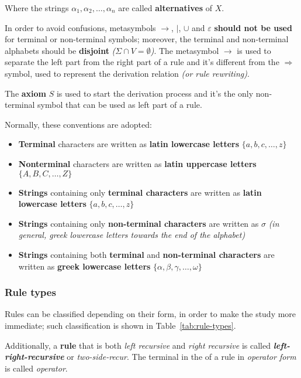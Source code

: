 \documentclass[english]{article}
\begin{document}
Where the strings \(\alpha_1, \alpha_2, \ldots, \alpha_n\) are called \textbf{alternatives} of \(X\).

In order to avoid confusions, metasymbols \(\rightarrow\), \(|\), \(\cup\) and \(\varepsilon\) \textbf{should not be used} for terminal or non-terminal symbols;
moreover, the terminal and non-terminal alphabets should be \textbf{disjoint} \textit{(\(\Sigma \cap V = \emptyset\))}.
The metasymbol \(\rightarrow\) is used to separate the left part from the right part of a rule and it's different from the \(\Rightarrow\) symbol, used to represent the derivation relation \textit{(or rule rewriting)}.

The \textbf{axiom} \(S\) is used to start the derivation process and it's the only non-terminal symbol that can be used as left part of a rule.

\bigskip
Normally, these conventions are adopted:

\begin{itemize}
  \item \textbf{Terminal} characters are written as \textbf{latin lowercase letters} \(\{a, b, c, \ldots, z\}\)
  \item \textbf{Nonterminal} characters are written as \textbf{latin uppercase letters} \(\{A, B, C, \ldots, Z\}\)
  \item \textbf{Strings} containing only \textbf{terminal characters} are written as \textbf{latin lowercase letters} \(\{a, b, c, \ldots, z\}\)
  \item \textbf{Strings} containing only \textbf{non-terminal characters} are written as \(\sigma\) \textit{(in general, greek lowercase letters towards the end of the alphabet)}
  \item \textbf{Strings} containing both \textbf{terminal} and \textbf{non-terminal characters} are written as \textbf{greek lowercase letters} \(\{\alpha, \beta, \gamma, \ldots, \omega\}\)
\end{itemize}

\subsubsection{Rule types}

Rules can be classified depending on their form, in order to make the study more immediate;
such classification is shown in Table~\ref{tab:rule-types}.

Additionally, a \textbf{rule} that is both \textit{left recursive} and \textit{right recursive} is called \textbf{\textit{left-right-recursive}} or \textit{two-side-recur}.
The terminal in the \RP of a rule in \textit{operator form} is called \textit{operator}.
\end{document}
